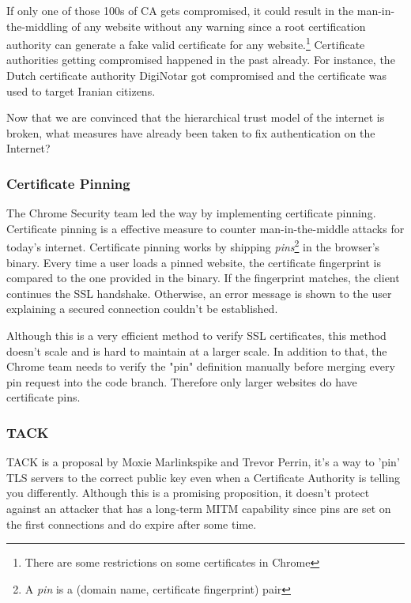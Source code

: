 \documentclass{vldb}
\begin{document}
If only one of those 100s of CA gets compromised, it could result in the man-in-the-middling of any website without any warning since a root certification authority can generate a fake valid certificate for any website.\footnote{There are some restrictions on some certificates in Chrome}
Certificate authorities getting compromised happened in the past already. For instance, the Dutch certificate authority DigiNotar got compromised\cite{diginotarHack} and the certificate was used to target Iranian citizens.

Now that we are convinced that the hierarchical trust model of the internet is broken, what measures have already been taken to fix authentication on the Internet?

\subsubsection{Certificate Pinning}

The Chrome Security team led the way by implementing certificate pinning. Certificate pinning is a effective measure to counter man-in-the-middle attacks for today's internet. Certificate pinning works by shipping \emph{pins}\footnote{A \emph{pin} is a (domain name, certificate fingerprint) pair} in the browser's binary.\cite{chromiumPins} Every time a user loads a pinned website, the certificate fingerprint is compared to the one provided in the binary. If the fingerprint matches, the client continues the SSL handshake. Otherwise, an error message is shown to the user explaining a secured connection couldn't be established.

Although this is a very efficient method to verify SSL certificates, this method doesn't scale and is hard to maintain at a larger scale. In addition to that, the Chrome team needs to verify the "pin" definition manually before merging every pin request into the code branch. Therefore only larger websites do have certificate pins.

\subsubsection{TACK}

TACK is a proposal by Moxie Marlinkspike and Trevor Perrin, it's a way to 'pin' TLS servers to the correct public key even when a Certificate Authority is telling you differently. Although this is a promising proposition, it doesn't protect against an attacker that has a long-term MITM capability since pins are set on the first connections and do expire after some time.\cite{tackMITM}
\end{document}
